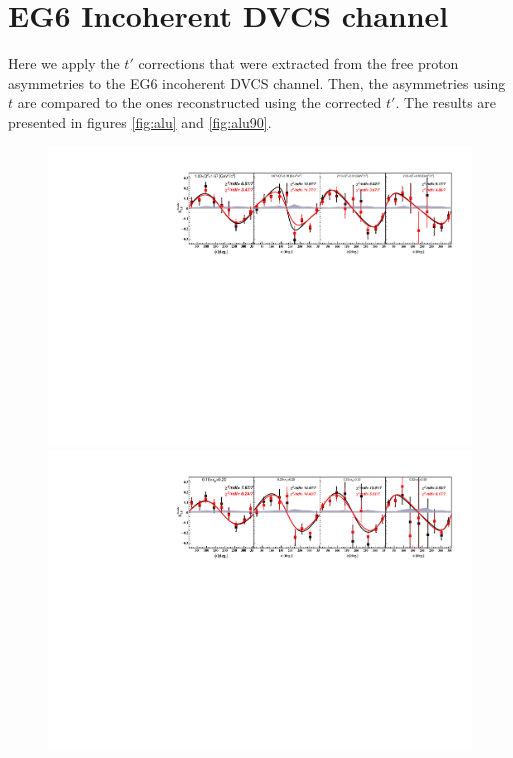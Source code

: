 \documentclass[a4paper,11pt,twoside]{article}
\begin{document}
\section{EG6 Incoherent DVCS channel}
Here we apply the $t'$ corrections that were extracted from the free proton 
asymmetries  to the EG6 incoherent DVCS channel. Then, the asymmetries using 
$t$ are compared to the ones reconstructed using the corrected $t'$. The 
results are presented in figures \ref{fig:alu} and \ref{fig:alu90}.

\begin{figure}[tb]
   \centering
\includegraphics[width=15cm]{fig/ALU_phi_p_Q2.pdf}
\includegraphics[width=15cm]{fig/ALU_phi_p_x.pdf}

\end{figure}
\end{document}
